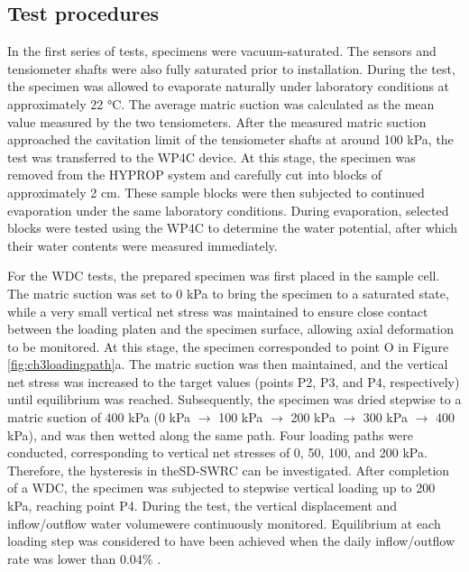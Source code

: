\subsection{Test procedures}
In the first series of tests, specimens were vacuum-saturated. The sensors and tensiometer shafts were also fully saturated prior to installation. During the test, the specimen was allowed to evaporate naturally under laboratory conditions at approximately 22 °C. The average matric suction was calculated as the mean value measured by the two tensiometers. After the measured matric suction approached the cavitation limit of the tensiometer shafts at around 100 kPa, the test was transferred to the WP4C device. At this stage, the specimen was removed from the HYPROP system and carefully cut into blocks of approximately 2 cm. These sample blocks were then subjected to continued evaporation under the same laboratory conditions. During evaporation, selected blocks were tested using the WP4C to determine the water potential, after which their water contents were measured immediately.\par
For the \ac{WDC} tests, the prepared specimen was first placed in the sample cell. The matric suction was set to 0 kPa to bring the specimen to a saturated state, while a very small vertical net stress was maintained to ensure close contact between the loading platen and the specimen surface, allowing axial deformation to be monitored. At this stage, the specimen corresponded to point O in Figure \ref{fig:ch3loadingpath}a. The matric suction was then maintained, and the vertical net stress was increased to the target values (points P2, P3, and P4, respectively) until equilibrium was reached. Subsequently, the specimen was dried stepwise to a matric suction of 400 kPa (0 kPa $\to$ 100 kPa $\to$ 200 kPa $\to$ 300 kPa $\to$ 400 kPa), and was then wetted along the same path. Four loading paths were conducted, corresponding to vertical net stresses of 0, 50, 100, and 200 kPa. Therefore, the hysteresis in the\ac{SD-SWRC} can be investigated. After completion of a \ac{WDC}, the specimen was subjected to stepwise vertical loading up to 200 kPa, reaching point P4. During the test, the vertical displacement and inflow/outflow water volumewere continuously monitored. Equilibrium at each loading step was considered to have been achieved when the daily inflow/outflow rate was lower than 0.04\% \parencite{ngWaterRetentionVolumetric2016a,muHydromechanicalBehaviorUnsaturated2023}.\par
